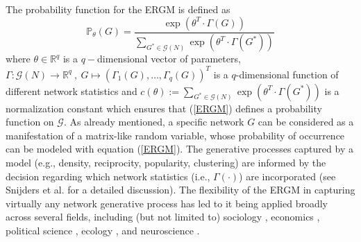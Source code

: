 \documentclass[10pt, conference, compsocconf]{IEEEtran}
\begin{document}
The probability function for the ERGM is defined as
\begin{equation}
\mathbb{P}_{\theta}(G)=\dfrac{\exp(\theta^T \cdot \Gamma(G))}{\sum_{G^* \in \mathcal{G}(N)} \exp(\theta^T \cdot \Gamma(G^*))} 
\label{ERGM}
\end{equation}
%
where $\theta \in \mathbb{R}^q$ is a $q-$dimensional vector of parameters, $\Gamma:\mathcal{G}(N) \to \mathbb{R}^q~,~G \mapsto (\Gamma_1(G),\dots,\Gamma_q(G))^T$ is a $q$-dimensional function of different network statistics and $c(\theta):= \sum_{G^* \in \mathcal{G}(N)} \exp(\theta^T \cdot \Gamma(G^*))$ is a normalization constant which ensures that (\ref{ERGM}) defines a probability function on $\mathcal{G}$.
%
As already mentioned, a specific network $G$ can be considered as a manifestation of a matrix-like random variable, whose probability of occurrence can be modeled with equation (\ref{ERGM}). The generative processes captured by a model (e.g., density, reciprocity, popularity, clustering) are informed by the decision regarding which network statistics (i.e., $\Gamma(\cdot)$) are incorporated (see Snijders et al. \cite{SnijdersTomA.B..2006} for a detailed discussion). The flexibility of the ERGM in capturing virtually any network generative process has led to it being applied broadly across several fields, including (but not limited to) sociology \cite{smith2016ethnic,srivastava2011culture}, economics \cite{lomi2012networks}, political science \cite{Cranmer.2011,lazer2010coevolution}, ecology \cite{dey2014individual,bouskila2015similarity}, and neuroscience \cite{simpson2011exponential,simpson2012exponential}.
\end{document}
